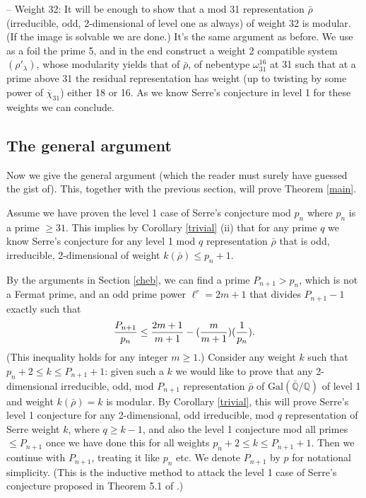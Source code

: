 \documentclass[12pt]{amsart}
\newcommand{\rhobar}{\overline{\rho}}
\def\rhobar{ {\bar {\rho} } }
\def\rhob{ {\bar {\rho} } }
\newcommand{\Galois}{\mathrm{Gal}}
\newcommand{\Gal}{\Galois( \bar{ {\mathbb Q}}/{\mathbb Q})}
\begin{document}
-- Weight 32: It will be enough to show that a mod 31 representation $\rhob$ (irreducible, odd, 2-dimensional of level one as always) of weight 32 is modular. (If the image is solvable we are done.) It's the same argument as before. We use as a foil the prime 5, and in the end construct a weight 2 compatible system $(\rho'_{\lambda})$, whose modularity yields that of $\rhobar$, 
of nebentype $\omega_{31}^{16}$ at 31
such that at a prime above 31 the residual representation has weight (up to twisting by some power of $\overline \chi_{31}$)
either 18 or 16. As we know Serre's conjecture in level 1 for these weights we can conclude.

\subsection{The general argument}

Now we give the general argument (which the reader 
must surely have guessed the gist of). This, together with the previous section, will prove Theorem \ref{main}.

Assume we have proven the level 1 case of Serre's 
conjecture mod $p_n$ where $p_n$ is a prime $\geq 31$. This implies by Corollary \ref{trivial} (ii)
that for any prime $q$ we know Serre's conjecture for any level 1 
mod $q$  representation $\rhobar$ that is odd, irreducible, 2-dimensional
of weight $ k(\rhobar) \leq p_n+1$.
 
By the arguments in Section \ref{cheb}, we can find a prime $P_{n+1}>p_n$, 
which is not a Fermat prime, and an odd prime power $\ell^r=2m+1$ that divides $P_{n+1}-1$ exactly such that
\begin{equation}\label{*}
{{P_{n+1}} \over {p_n}} \leq 
{2m+1 \over m+1} - ({m \over m+1})({1 \over p_n}).
\end{equation} (This inequality holds for any integer $m \geq 1$.)
Consider any weight $k$ such that $p_n+2 \leq k \leq P_{n+1}+1$: 
given such a $k$ 
we would like
to prove that any 2-dimensional irreducible, odd, mod $P_{n+1}$ representation $\rhobar$ of $\Gal$ of level 1 and weight $k(\rhobar)=k$ is modular. 
By Corollary \ref{trivial}, this will prove Serre's level 1 conjecture
for any 2-dimensional, odd irreducible, mod $q$ representation 
of Serre weight $k$, where $q  \geq k-1$, and also the level 1 conjecture mod all primes $\leq P_{n+1}$ 
once we have done this for all weights $p_n+2 \leq k \leq P_{n+1}+1$. Then we continue with $P_{n+1}$, treating it like $p_n$ etc.
We denote $P_{n+1}$ by $p$ for notational 
simplicity. (This is the inductive method 
to attack the level 1 case of Serre's conjecture 
proposed in Theorem 5.1 of \cite{KW}.)
\end{document}
